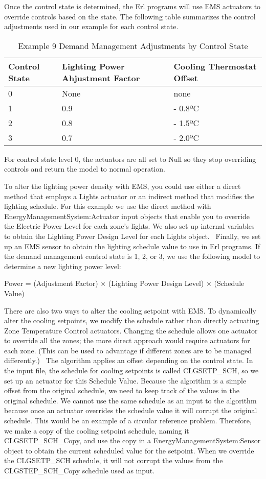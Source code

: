 Once the control state is determined, the Erl programs will use EMS actuators to override controls based on the state. The following table summarizes the control adjustments used in our example for each control state.

\begin{longtable}[c]{p{1.5in}p{2.54in}p{1.94in}}
\caption{Example 9 Demand Management Adjustments by Control State \protect \label{table:example-9-demand-management-adjustments-by}}\\
\toprule 
Control State & Lighting Power Ahjustment Factor & Cooling Thermostat Offset \tabularnewline \midrule
\endhead
0 & None & none \tabularnewline
1 & 0.9 & -   0.8ºC \tabularnewline
2 & 0.8 & -   1.5ºC \tabularnewline
3 & 0.7 & -   2.0ºC \tabularnewline
\bottomrule
\end{longtable}

For control state level 0, the actuators are all set to Null so they stop overriding controls and return the model to normal operation.

To alter the lighting power density with EMS, you could use either a direct method that employs a Lights actuator or an indirect method that modifies the lighting schedule. For this example we use the direct method with EnergyManagementSystem:Actuator input objects that enable you to override the Electric Power Level for each zone's lights. We also set up internal variables to obtain the Lighting Power Design Level for each Lights object.~ Finally, we set up an EMS sensor to obtain the lighting schedule value to use in Erl programs. If the demand management control state is 1, 2, or 3, we use the following model to determine a new lighting power level:

Power = (Adjustment Factor) × (Lighting Power Design Level) × (Schedule Value)

There are also two ways to alter the cooling setpoint with EMS. To dynamically alter the cooling setpoints, we modify the schedule rather than directly actuating Zone Temperature Control actuators. Changing the schedule allows one actuator to override all the zones; the more direct approach would require actuators for each zone. (This can be used to advantage if different zones are to be managed differently.)~ The algorithm applies an offset depending on the control state. In the input file, the schedule for cooling setpoints is called CLGSETP\_SCH, so we set up an actuator for this Schedule Value. Because the algorithm is a simple offset from the original schedule, we need to keep track of the values in the original schedule. We cannot use the same schedule as an input to the algorithm because once an actuator overrides the schedule value it will corrupt the original schedule. This would be an example of a circular reference problem. Therefore, we make a copy of the cooling setpoint schedule, naming it CLGSETP\_SCH\_Copy, and use the copy in a EnergyManagementSystem:Sensor object to obtain the current scheduled value for the setpoint. When we override the CLGSETP\_SCH schedule, it will not corrupt the values from the CLGSTEP\_SCH\_Copy schedule used as input.

